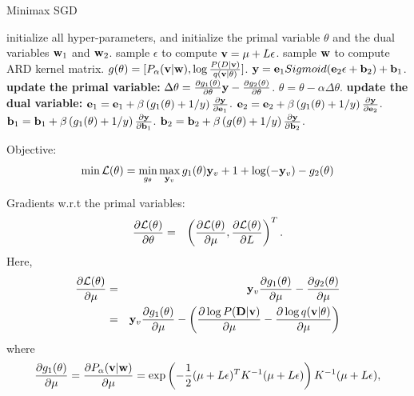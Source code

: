 \documentclass{article}
\def\e{{\bf e}}
\def\b{{\bf b}}
\def\v{{\bf v}}
\def\y{{\bf y}}
\def\w{{\bf w}}
\def\D{{\bf D}}
\begin{document}
\begin{algorithm}[!t]
    \caption{Minimax SGD}
    \label{algorithm_vrkm_plus_plus}
    \begin{algorithmic}[1]
        \State initialize all hyper-parameters, and initialize the primal variable $\theta$ and the dual variables $\w_1$ and $\w_2$.
        \State sample $\epsilon$ to compute $\v=\mu+L\epsilon$.
        \State sample $\w$ to compute ARD kernel matrix.
        \State $g(\theta) = [P_{\alpha}(\v|\w), \log\frac{P(D|\v)}{q(\v|\theta)}]$.
        \State $\y=\e_1 Sigmoid( \e_2 \epsilon + \b_2) + \b_1$.
        \State \textbf{update the primal variable:} 
        \State $\Delta \theta = \frac{\partial g_1(\theta) }{\partial \theta} \y - \frac{\partial g_2(\theta) }{\partial \theta}$.
        \State $\theta = \theta - \alpha \Delta \theta$.
        \State \textbf{update the dual variable:} 
        \State $\e_1 = \e_1 + \beta \left (g_1(\theta) + 1/y \right)\frac{\partial \y}{\partial \e_1}$.
        \State $\e_2 = \e_2 + \beta \left (g_1(\theta) + 1/y \right)\frac{\partial \y}{\partial \e_2} $.
        \State $\b_1 = \b_1 + \beta \left ( g_1(\theta) + 1/y\right)\frac{\partial \y}{\partial \b_1}$.
        \State $\b_2 = \b_2 + \beta \left ( g(\theta) + 1/y \right)\frac{\partial \y}{\partial \b_2}$.
        \EndFor
    \end{algorithmic}
\end{algorithm}



Objective: 
\begin{eqnarray}
\setlength{\abovedisplayskip}{0pt}
\setlength{\belowdisplayskip}{0pt}
\nonumber
\min \mathcal{L}(\theta) = \min_{g_{\theta}}\max_{\y_v} g_1(\theta)\y_v + 1+ \log(-\y_v) - g_2(\theta)
\end{eqnarray}

Gradients w.r.t the primal variables:
\begin{eqnarray}
\setlength{\abovedisplayskip}{0pt}
\setlength{\belowdisplayskip}{0pt}
\nonumber
\frac{\partial \mathcal{L}(\theta)}{\partial \theta} &=& \left( \frac{\partial \mathcal{L}(\theta)}{\partial \mu}, \frac{\partial \mathcal{L}(\theta)}{\partial L} \right)^T.
\end{eqnarray} Here,
\begin{eqnarray}
\setlength{\abovedisplayskip}{0pt}
\setlength{\belowdisplayskip}{0pt}
\nonumber
\frac{\partial \mathcal{L}(\theta)}{\partial \mu} &=& \y_v \frac{\partial g_1(\theta)}{\partial \mu} - \frac{\partial g_2(\theta)}{\partial \mu} \\ \nonumber
&=& \y_v \frac{\partial g_1(\theta)}{\partial \mu} - \left( \frac{\partial \log P(\D|\v)}{\partial \mu} - \frac{\partial \log q(\v|\theta)}{\partial \mu} \right)
\end{eqnarray} where
\begin{eqnarray}
\setlength{\abovedisplayskip}{0pt}
\setlength{\belowdisplayskip}{0pt}
\nonumber
\frac{\partial g_1(\theta)}{\partial \mu} = \frac{\partial P_{\alpha}(\v|\w)}{\partial \mu} =  \exp\left(-\frac{1}{2}(\mu+L\epsilon)^T K^{-1} (\mu+L\epsilon)\right) K^{-1}(\mu+L\epsilon),
\end{eqnarray}
\end{document}
